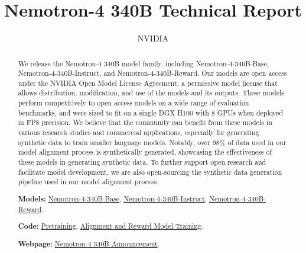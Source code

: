 \documentclass[11pt]{article}
\title{Nemotron-4 340B Technical Report}
\date{}
\author{NVIDIA}
\newcommand{\ours}{Nemotron-4-340B-Base}
\newcommand{\oursin}{Nemotron-4-340B-Instruct}
\newcommand{\oursrm}{Nemotron-4-340B-Reward}
\begin{document}
\parindent 0.0in
\parskip 0.15in

\maketitle

\begin{abstract}
We release the Nemotron-4 340B model family, including \ours{}, \oursin{}, and \oursrm{}. 
Our models are open access under the NVIDIA Open Model License Agreement, a permissive model license that allows distribution, modification, and use of the models and its outputs.
These models perform competitively to open access models on a wide range of evaluation benchmarks, and were sized to fit on a single DGX H100 with 8 GPUs when deployed in FP8 precision.
We believe that the community can benefit from these models in various research studies and commercial applications, especially for generating synthetic data to train smaller language models.
Notably, over 98\% of data used in our model alignment process is synthetically generated, showcasing the effectiveness of these models in generating synthetic data.
To further support open research and facilitate model development, we are also open-sourcing the synthetic data generation pipeline used in our model alignment process.


\textbf{Models:} \href{https://huggingface.co/nvidia/Nemotron-4-340B-Base}{\ours{}}, \href{https://huggingface.co/nvidia/Nemotron-4-340B-Instruct}{\oursin{}}, \href{https://huggingface.co/nvidia/Nemotron-4-340B-Reward}{\oursrm{}}.



\textbf{Code:} \href{https://github.com/NVIDIA/Megatron-LM}{Pretraining}, \href{https://github.com/NVIDIA/NeMo-Aligner}{Alignment and Reward Model Training}.

\textbf{Webpage:} \href{https://blogs.nvidia.com/blog/nemotron-4-synthetic-data-generation-llm-training/}{Nemotron-4 340B Announcement}.
\end{abstract}
\end{document}
